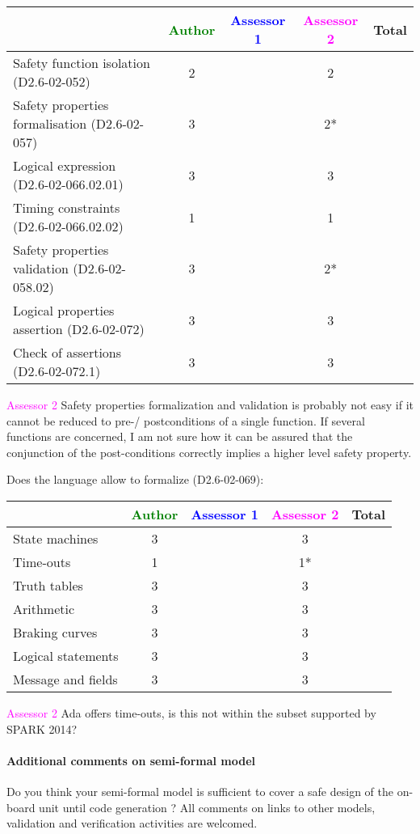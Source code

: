 \begin{tabular}{|l | c | c | c | c|}
\hline
& \textcolor{green}{Author} & \textcolor{blue}{Assessor 1} & \textcolor{magenta}{Assessor 2} & Total \\
\hline 
Safety function isolation (D2.6-02-052)  & 2 & & 2 &  \\
\hline 
Safety properties formalisation (D2.6-02-057)  & 3 & & 2* &  \\
\hline
Logical expression (D2.6-02-066.02.01)  & 3 & & 3 &  \\
\hline
Timing constraints (D2.6-02-066.02.02)  & 1 & & 1 &  \\
\hline
Safety properties validation (D2.6-02-058.02)  & 3 & & 2* &  \\
\hline
Logical properties assertion (D2.6-02-072)  & 3 & & 3 &  \\
\hline
Check  of assertions (D2.6-02-072.1)  & 3 & & 3 &  \\
\hline
\end{tabular}

\textcolor{magenta}{Assessor 2} Safety properties formalization and validation
is probably not easy if it cannot be reduced to pre-/ postconditions of a single
function. If several functions are concerned, I am not sure how it can be
assured that the conjunction of the post-conditions correctly implies a higher
level safety property.

Does the language allow to  formalize (D2.6-02-069):

\begin{tabular}{|l | c | c | c | c|}
\hline
& \textcolor{green}{Author} & \textcolor{blue}{Assessor 1} & \textcolor{magenta}{Assessor 2} & Total \\
\hline 
State machines  & 3 & & 3 &  \\
\hline
Time-outs  & 1 & & 1* &  \\
\hline
Truth tables  & 3 & & 3 &  \\
\hline
Arithmetic  & 3 & & 3 &  \\
\hline
Braking curves  & 3 & & 3 &  \\
\hline
Logical statements & 3 & & 3 &  \\
\hline
Message and fields & 3 & & 3 &  \\
\hline
\end{tabular}

\textcolor{magenta}{Assessor 2} Ada offers time-outs, is this not within the
subset supported by SPARK 2014?

\paragraph{Additional comments on semi-formal  model} Do you think your semi-formal  model is sufficient to cover a safe design of the on-board unit until code generation ?
All comments on links to  other models, validation and verification activities are welcomed.

